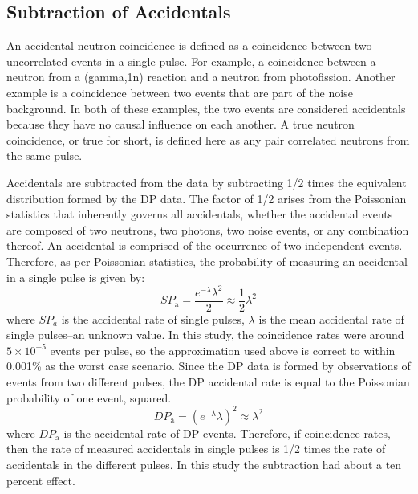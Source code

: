 \subsection{Subtraction of Accidentals}
\label{Subtraction of Accidentals}
An accidental neutron coincidence is defined as a coincidence between two uncorrelated events in a single pulse.
For example, a coincidence between a neutron from a (gamma,1n) reaction and a neutron from photofission.
Another example is a coincidence between two events that are part of the noise background.
In both of these examples, the two events are considered accidentals because they have no causal influence on each another.
A true neutron coincidence, or true for short, is defined here as any pair correlated neutrons from the same pulse.

Accidentals are subtracted from the data by subtracting 1/2 times the equivalent distribution formed by the DP data.
The factor of 1/2 arises from the Poissonian statistics that inherently governs all accidentals, whether the accidental events are composed of two neutrons, two photons, two noise events, or any combination thereof.
An accidental is comprised of the occurrence of two independent events.
Therefore, as per Poissonian statistics, the probability of measuring an accidental in a single pulse is given by:
\begin{displaymath}
SP_{\text{a}} = \frac{e^{-\lambda}\lambda^2}{2} \approx \frac{1}{2}\lambda^{2}
\end{displaymath}
where $SP_{a}$ is the accidental rate of single pulses, $\lambda$ is the mean accidental rate of single pulses–an unknown value.
In this study, the coincidence rates were around $5\times10^{-5}$ events per pulse, so the approximation used above is correct to within 0.001\% as the worst case scenario.
Since the DP data is formed by observations of events from two different pulses, the DP accidental rate is equal to the Poissonian probability of one event, squared.
\begin{displaymath}
DP_{\text{a}} = (e^{-\lambda}\lambda)^{2}\approx \lambda^{2} 
\end{displaymath}
where $DP_{\text{a}}$ is the accidental rate of DP events.
Therefore, if coincidence rates, then the rate of measured accidentals in single pulses is 1/2 times the rate of accidentals in the different pulses.
In this study the subtraction had about a ten percent effect.
